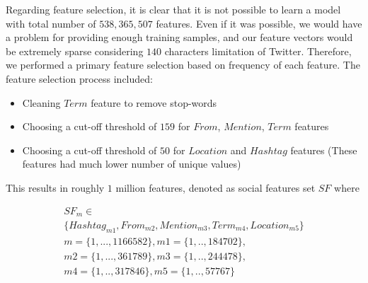 Regarding feature selection, it is clear that it is not possible to learn a model with total number of $538,365,507$ features. Even if it was possible, we would have a problem for providing enough training samples, and our feature vectors would be extremely sparse considering $140$ characters limitation of Twitter. Therefore, we performed a primary feature selection based on frequency of each feature. The feature selection process included:
\begin{itemize}
\item Cleaning $Term$ feature to remove stop-words
\item Choosing a cut-off threshold of $159$ for $From$, $Mention$, $Term$ features
\item Choosing a cut-off threshold of $50$ for $Location$ and $Hashtag$ features (These features had much lower number of unique values)
\end{itemize} 
This results in roughly $1$ million features, denoted as social features set $SF$ where 

\begin{multline}
{SF_{m}} \in \\
 \{ Hashtag_{m1}, From_{m2}, Mention_{m3}, Term_{m4}, Location_{m5} \} \\
 {m = \{1,...,1166582 \}}, {m1 = \{1,..,184702 \}}, \\
  m2 = \{1,...,361789 \}, m3= \{1,..,244478 \}, \\
  m4= \{1,..,317846 \}, m5= \{1,.., 57767 \}
\end{multline}


